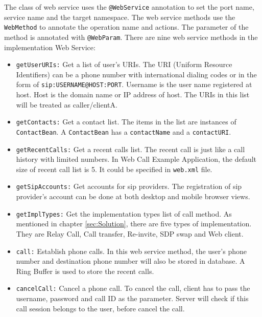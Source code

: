 The class of web service uses the \texttt{@WebService} annotation to set the port name, service name and the target namespace. The web service methods use the \texttt{WebMethod} to annotate the operation name and actions.  The parameter of the method is annotated with \texttt{@WebParam}.
There are nine web service methods in the implementation Web Service:
\begin{itemize}

\item \texttt{getUserURIs:} Get a list of user's URIs. The URI (Uniform Resource Identifiers) can be a phone number with international dialing codes or in the form of \texttt{sip:USERNAME@HOST:PORT}. Username is the user name registered at host. Host is the domain name or IP address of host. The URIs in this list will be treated as caller/clientA. 

\item \texttt{getContacts:} Get a contact list. The items in the list are instances of \texttt{ContactBean}. A \texttt{ContactBean} has a \texttt{contactName} and a \texttt{contactURI}.

\item \texttt{getRecentCalls:} Get a recent calls list. The recent call is just like a call history with limited numbers. In Web Call Example Application, the default size of recent call list is 5. It could be specified in \texttt{web.xml} file.

\item \texttt{getSipAccounts:} Get accounts for sip providers. The registration of sip provider's account can be done at both desktop and mobile browser views.

\item \texttt{getImplTypes:} Get the implementation types list of call method. As mentioned in chapter \ref{sec:Solution}, there are five types of implementation. They are \textsf{Relay Call}, 
\textsf{Call transfer}, \textsf{Re-invite}, \textsf{SDP swap} and \textsf{Web client}.

\item \texttt{call:} Establish phone calls. In this web service method, the user's phone number and destination phone number will also be stored in database. A \textsf{Ring Buffer} is used to store the recent calls.

\item \texttt{cancelCall:} Cancel a phone call. To cancel the call, client has to pass the username, password and call ID as the parameter. Server will check if this call session belongs to the user, before cancel the call.


\end{itemize}
